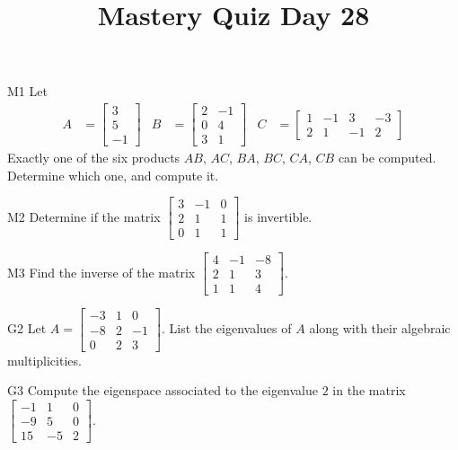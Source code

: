 \documentclass{sbgLAquiz}
\title{Mastery Quiz Day 28 }
\begin{document}
\begin{problem}{M1}
Let
\begin{align*}
A &= \begin{bmatrix} 3 \\ 5 \\ -1  \end{bmatrix} & B &= \begin{bmatrix} 2 & -1 \\ 0 & 4 \\ 3 & 1 \end{bmatrix} & C&=\begin{bmatrix} 1 & -1 & 3 & -3 \\ 2 & 1 & -1 & 2 \end{bmatrix}
\end{align*}
Exactly one of the six products $AB$, $AC$, $BA$, $BC$, $CA$, $CB$ can be computed.  Determine which one, and compute it.
\end{problem}

\begin{problem}{M2}
Determine if the matrix $\begin{bmatrix} 3 & -1 & 0  \\ 2 & 1 & 1  \\ 0 & 1 & 1   \end{bmatrix}$ is invertible.
\end{problem}
\newpage

\begin{problem}{M3}
  Find the inverse of the matrix
  \(\begin{bmatrix}
    4 & -1 & -8  \\
    2 & 1 & 3  \\
    1 & 1 & 4
  \end{bmatrix}\).
\end{problem}

\begin{problem}{G2}
Let $A= \begin{bmatrix}-3 & 1 & 0 \\ -8 & 2 & -1 \\ 0 & 2 & 3\end{bmatrix}$.
List the eigenvalues of $A$ along with their algebraic multiplicities.
\end{problem}
\newpage

\begin{problem}{G3}
Compute the eigenspace associated to the eigenvalue $2$ in the matrix $\begin{bmatrix} -1 & 1 & 0 \\ -9 & 5 & 0 \\ 15 & -5 & 2 \end{bmatrix}$.
\end{problem}
\end{document}
